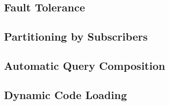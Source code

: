 \subsection{Fault Tolerance}

\subsection{Partitioning by Subscribers}

\subsection{Automatic Query Composition}

\subsection{Dynamic Code Loading}
